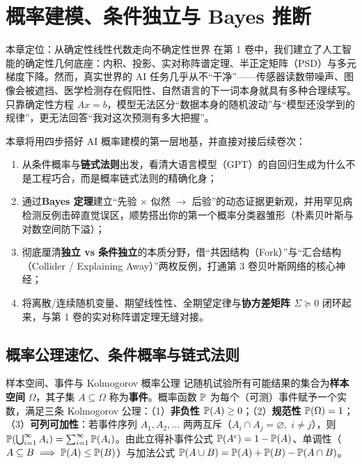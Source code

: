 \chapter[概率建模、条件独立与 Bayes 推断]{概率建模、条件独立与 Bayes 推断}
\label{ch:ch1}


\begin{chapIntro}{本章定位：从确定性线性代数走向不确定性世界}
在第 1 卷中，我们建立了人工智能的确定性几何底座：内积、投影、实对称阵谱定理、半正定矩阵（PSD）与多元梯度下降。然而，真实世界的 AI 任务几乎从不“干净”——传感器读数带噪声、图像会被遮挡、医学检测存在假阳性、自然语言的下一词本身就具有多种合理续写。只靠确定性方程 $Ax = b$，模型无法区分“数据本身的随机波动”与“模型还没学到的规律”，更无法回答“我对这次预测有多大把握”。

本章将用四步搭好 AI 概率建模的第一层地基，并直接对接后续卷次：
\begin{enumerate}
  \item 从条件概率与\textbf{链式法则}出发，看清大语言模型（GPT）的自回归生成为什么不是工程巧合，而是概率链式法则的精确化身；
  \item 通过\textbf{Bayes 定理}建立“先验 $\times$ 似然 $\to$ 后验”的动态证据更新观，并用罕见病检测反例击碎直觉误区，顺势搭出你的第一个概率分类器雏形（朴素贝叶斯与对数空间防下溢）；
  \item 彻底厘清\textbf{独立 vs 条件独立}的本质分野，借“共因结构（Fork）”与“汇合结构（Collider / Explaining Away）”两枚反例，打通第 3 卷贝叶斯网络的核心神经；
  \item 将离散/连续随机变量、期望线性性、全期望定律与\textbf{协方差矩阵 $\Sigma \succeq 0$} 闭环起来，与第 1 卷的实对称阵谱定理无缝对接。
\end{enumerate}
\end{chapIntro}

\section{概率公理速忆、条件概率与链式法则}
\label{sec:ch1-axioms-chain}

\begin{recallBox}{样本空间、事件与 Kolmogorov 概率公理}
记随机试验所有可能结果的集合为\textbf{样本空间} $\Omega$，其子集 $A \subseteq \Omega$ 称为\textbf{事件}。概率函数 $\mathbb{P}$ 为每个（可测）事件赋予一个实数，满足三条 Kolmogorov 公理：（1）\textbf{非负性} $\mathbb{P}(A) \ge 0$；（2）\textbf{规范性} $\mathbb{P}(\Omega) = 1$；（3）\textbf{可列可加性}：若事件序列 $A_1, A_2, \dots$ 两两互斥（$A_i \cap A_j = \varnothing,\; i\neq j$），则 $\mathbb{P}\!\left(\bigcup_{i=1}^\infty A_i\right) = \sum_{i=1}^\infty \mathbb{P}(A_i)$。由此立得补事件公式 $\mathbb{P}(A^c) = 1 - \mathbb{P}(A)$、单调性（$A \subseteq B \implies \mathbb{P}(A) \le \mathbb{P}(B)$）与加法公式 $\mathbb{P}(A \cup B) = \mathbb{P}(A) + \mathbb{P}(B) - \mathbb{P}(A \cap B)$。
\end{recallBox}

